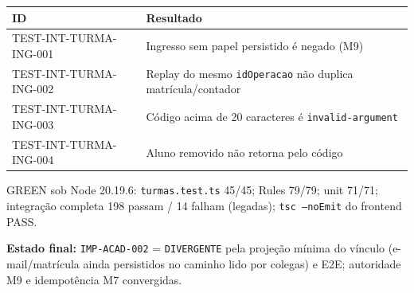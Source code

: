 \small
\begin{longtable}{@{}p{}p{}@{}}
\toprule
ID & Resultado \\
\midrule
\endhead
TEST-INT-TURMA-ING-001 & Ingresso sem papel persistido é negado (M9) \\
TEST-INT-TURMA-ING-002 & Replay do mesmo \texttt{idOperacao} não duplica matrícula/contador \\
TEST-INT-TURMA-ING-003 & Código acima de 20 caracteres é \texttt{invalid-argument} \\
TEST-INT-TURMA-ING-004 & Aluno removido não retorna pelo código \\
\bottomrule
\end{longtable}
\normalsize

GREEN sob Node 20.19.6: \texttt{turmas.test.ts} 45/45; Rules 79/79; unit 71/71;
integração completa 198 passam / 14 falham (legadas); \texttt{tsc --noEmit} do
frontend PASS.

\textbf{Estado final:} \texttt{IMP-ACAD-002} = \texttt{DIVERGENTE} pela projeção
mínima do vínculo (e-mail/matrícula ainda persistidos no caminho lido por
colegas) e E2E; autoridade M9 e idempotência M7 convergidas.
